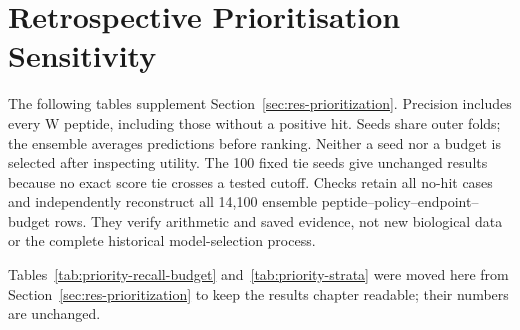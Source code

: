 \FloatBarrier
\section{Retrospective Prioritisation Sensitivity}
The following tables supplement Section~\ref{sec:res-prioritization}. Precision includes every
W peptide, including those without a positive hit. Seeds share outer folds; the ensemble averages
predictions before ranking. Neither a seed nor a budget is selected after inspecting utility.
The 100 fixed tie seeds give unchanged results because no exact score tie crosses a tested
cutoff. Checks retain all no-hit cases and independently reconstruct all 14,100 ensemble
peptide--policy--endpoint--budget rows. They verify arithmetic and saved evidence, not new
biological data or the complete historical model-selection process.

\begin{table}[htbp]
  \centering
  \caption[Positive Precision@10 in percent for each seed and the three-seed ensemble]{Positive Precision@10 in percent for each seed and the three-seed ensemble.
  Every row and column uses 2,350 selections on 235 peptides.}
  \label{tab:priority-seeds}
  
\end{table}
\begin{table}[htbp]
  \centering
  \caption[Positive peptide-macro precision in percent across the six fixed analysis budgets]{Positive peptide-macro precision in percent across the six fixed analysis budgets.
  Total selections are equal across policies within each row. Fractional budgets use ceiling
  rounding within each peptide and differ from a fixed ten-mutation budget.}
  \label{tab:priority-budgets}
  
\end{table}
\FloatBarrier
{}

Tables~\ref{tab:priority-recall-budget} and~\ref{tab:priority-strata} were moved here from
Section~\ref{sec:res-prioritization} to keep the results chapter readable; their numbers are unchanged.

\begin{table}[htbp]
  \centering
  \caption[Mean selections to reach a known positive-hit recall, on 198 peptides with hits]{Mean selections to reach a known positive-hit recall, on 198 peptides with hits.
  Each peptide target is rounded upward. Random values are expected order-statistic ranks.}
  \label{tab:priority-recall-budget}
  
\end{table}

